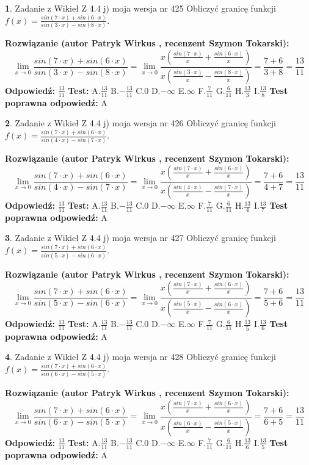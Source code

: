 \documentclass[12pt, a4paper]{article}
\theoremstyle{definition} %
\newtheorem{zad}{}
\newcommand{\zadStart}[1]{\begin{zad}#1\newline}
\newcommand{\zadStop}{\end{zad}}
\newcommand{\rozwStart}[2]{\noindent \textbf{Rozwiązanie (autor #1 , recenzent #2): }\newline}
\newcommand{\rozwStop}{\newline}
\newcommand{\odpStart}{\noindent \textbf{Odpowiedź:}\newline}
\newcommand{\odpStop}{\newline}
\newcommand{\testStart}{\noindent \textbf{Test:}\newline}
\newcommand{\testStop}{\newline}
\newcommand{\kluczStart}{\noindent \textbf{Test poprawna odpowiedź:}\newline}
\newcommand{\kluczStop}{\newline}
\begin{document}
\zadStart{Zadanie z Wikieł Z 4.4 j) moja wersja nr 425}
Obliczyć granicę funkcji $f(x)=\frac{sin(7\cdot x) +sin(6\cdot x)}{sin(3\cdot x) -sin(8\cdot x)}$.
\zadStop
\rozwStart{Patryk Wirkus}{Szymon Tokarski}
$$\lim\limits_{x\to 0}\frac{sin(7\cdot x) +sin(6\cdot x)}{sin(3\cdot x) -sin(8\cdot x)}=\lim\limits_{x\to 0}\frac{x(\frac{sin(7\cdot x)}{x}+\frac{sin(6\cdot x)}{x})}{x(\frac{sin(3\cdot x)}{x}-\frac{sin(8\cdot x)}{x})}=\frac{7+6}{3+8} = \frac{13}{11}$$
\rozwStop
\odpStart
$\frac{13}{11}$
\odpStop
\testStart
A.$\frac{13}{11}$
B.$-\frac{13}{11}$
C.$0$
D.$-\infty$
E.$\infty$
F.$\frac{7}{11}$
G.$\frac{6}{11}$
H.$\frac{13}{3}$
I.$\frac{13}{8}$
\testStop
\kluczStart
A
\kluczStop



\zadStart{Zadanie z Wikieł Z 4.4 j) moja wersja nr 426}
Obliczyć granicę funkcji $f(x)=\frac{sin(7\cdot x) +sin(6\cdot x)}{sin(4\cdot x) -sin(7\cdot x)}$.
\zadStop
\rozwStart{Patryk Wirkus}{Szymon Tokarski}
$$\lim\limits_{x\to 0}\frac{sin(7\cdot x) +sin(6\cdot x)}{sin(4\cdot x) -sin(7\cdot x)}=\lim\limits_{x\to 0}\frac{x(\frac{sin(7\cdot x)}{x}+\frac{sin(6\cdot x)}{x})}{x(\frac{sin(4\cdot x)}{x}-\frac{sin(7\cdot x)}{x})}=\frac{7+6}{4+7} = \frac{13}{11}$$
\rozwStop
\odpStart
$\frac{13}{11}$
\odpStop
\testStart
A.$\frac{13}{11}$
B.$-\frac{13}{11}$
C.$0$
D.$-\infty$
E.$\infty$
F.$\frac{7}{11}$
G.$\frac{6}{11}$
H.$\frac{13}{4}$
I.$\frac{13}{7}$
\testStop
\kluczStart
A
\kluczStop



\zadStart{Zadanie z Wikieł Z 4.4 j) moja wersja nr 427}
Obliczyć granicę funkcji $f(x)=\frac{sin(7\cdot x) +sin(6\cdot x)}{sin(5\cdot x) -sin(6\cdot x)}$.
\zadStop
\rozwStart{Patryk Wirkus}{Szymon Tokarski}
$$\lim\limits_{x\to 0}\frac{sin(7\cdot x) +sin(6\cdot x)}{sin(5\cdot x) -sin(6\cdot x)}=\lim\limits_{x\to 0}\frac{x(\frac{sin(7\cdot x)}{x}+\frac{sin(6\cdot x)}{x})}{x(\frac{sin(5\cdot x)}{x}-\frac{sin(6\cdot x)}{x})}=\frac{7+6}{5+6} = \frac{13}{11}$$
\rozwStop
\odpStart
$\frac{13}{11}$
\odpStop
\testStart
A.$\frac{13}{11}$
B.$-\frac{13}{11}$
C.$0$
D.$-\infty$
E.$\infty$
F.$\frac{7}{11}$
G.$\frac{6}{11}$
H.$\frac{13}{5}$
I.$\frac{13}{6}$
\testStop
\kluczStart
A
\kluczStop



\zadStart{Zadanie z Wikieł Z 4.4 j) moja wersja nr 428}
Obliczyć granicę funkcji $f(x)=\frac{sin(7\cdot x) +sin(6\cdot x)}{sin(6\cdot x) -sin(5\cdot x)}$.
\zadStop
\rozwStart{Patryk Wirkus}{Szymon Tokarski}
$$\lim\limits_{x\to 0}\frac{sin(7\cdot x) +sin(6\cdot x)}{sin(6\cdot x) -sin(5\cdot x)}=\lim\limits_{x\to 0}\frac{x(\frac{sin(7\cdot x)}{x}+\frac{sin(6\cdot x)}{x})}{x(\frac{sin(6\cdot x)}{x}-\frac{sin(5\cdot x)}{x})}=\frac{7+6}{6+5} = \frac{13}{11}$$
\rozwStop
\odpStart
$\frac{13}{11}$
\odpStop
\testStart
A.$\frac{13}{11}$
B.$-\frac{13}{11}$
C.$0$
D.$-\infty$
E.$\infty$
F.$\frac{7}{11}$
G.$\frac{6}{11}$
H.$\frac{13}{6}$
I.$\frac{13}{5}$
\testStop
\kluczStart
A
\kluczStop
\end{document}
